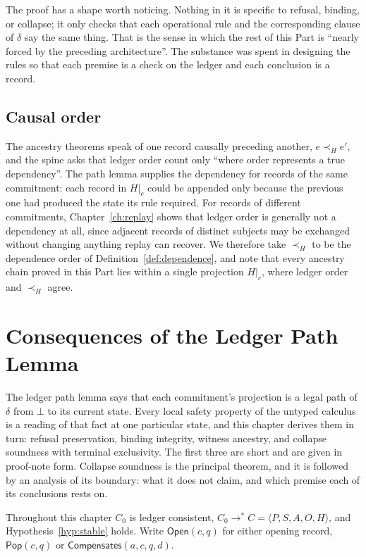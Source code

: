 \documentclass[11pt,openany]{book}
\theoremstyle{remark}
\newcommand{\Pop}{\mathsf{Pop}}
\newcommand{\Compensates}{\mathsf{Compensates}}
\begin{document}
The proof has a shape worth noticing. Nothing in it is specific to
refusal, binding, or collapse; it only checks that each operational rule
and the corresponding clause of $\delta$ say the same thing. That is the
sense in which the rest of this Part is ``nearly forced by the preceding
architecture''. The substance was spent in designing the rules so that
each premise is a check on the ledger and each conclusion is a record.

\section{Causal order}

The ancestry theorems speak of one record causally preceding another,
$e\prec_H e'$, and the spine asks that ledger order count only ``where
order represents a true dependency''. The path lemma supplies the
dependency for records of the same commitment: each record in $H|_c$ could
be appended only because the previous one had produced the state its rule
required. For records of different commitments, Chapter~\ref{ch:replay}
shows that ledger order is generally not a dependency at all, since
adjacent records of distinct subjects may be exchanged without changing
anything replay can recover. We therefore take $\prec_H$ to be the
dependence order of Definition~\ref{def:dependence}, and note that every
ancestry chain proved in this Part lies within a single projection $H|_c$,
where ledger order and $\prec_H$ agree.

\chapter{Consequences of the Ledger Path Lemma}
\label{ch:rbe}

The ledger path lemma says that each commitment's projection is a legal
path of $\delta$ from $\bot$ to its current state. Every local safety
property of the untyped calculus is a reading of that fact at one
particular state, and this chapter derives them in turn: refusal
preservation, binding integrity, witness ancestry, and collapse soundness
with terminal exclusivity. The first three are short and are given in
proof-note form. Collapse soundness is the principal theorem, and it is
followed by an analysis of its boundary: what it does not claim, and
which premise each of its conclusions rests on.

Throughout this chapter $C_0$ is ledger consistent,
$C_0\to^{*}C=\langle P,S,A,O,H\rangle$, and Hypothesis~\ref{hyp:stable}
holds. Write $\mathsf{Open}(c,q)$ for either opening record, $\Pop(c,q)$
or $\Compensates(a,c,q,d)$.
\end{document}
